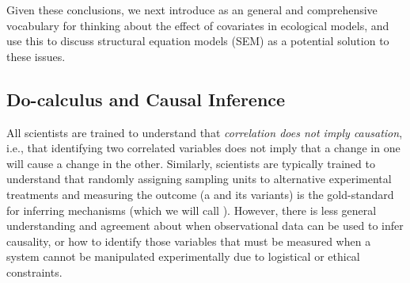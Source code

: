 Given these conclusions, we next introduce  as an general and comprehensive vocabulary for thinking about the effect of covariates in ecological models, and use this to discuss structural equation models (SEM) as a potential solution to these issues.  

\subsection{Do-calculus and Causal Inference} \label{sec:Chap7_do-calculus}

All scientists are trained to understand that \textit{correlation does not imply causation}, i.e., that identifying two correlated variables does not imply that a change in one will cause a change in the other.  Similarly, scientists are typically trained to understand that randomly assigning sampling units to alternative experimental treatments and measuring the outcome (a  and its variants) is the gold-standard for inferring mechanisms (which we will call ).  However, there is less general understanding and agreement about when observational data can be used to infer causality, or how to identify those variables that must be measured when a system cannot be manipulated experimentally due to logistical or ethical constraints.  


